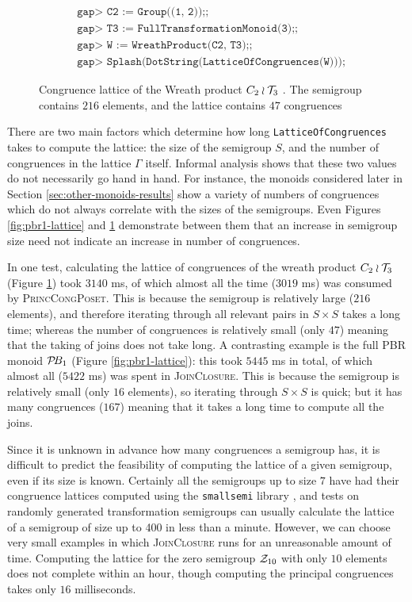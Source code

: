 \begin{figure}[h]
  \begin{align*}
    &\texttt{gap> C2 := Group((1, 2));;} \\
    &\texttt{gap> T3 := FullTransformationMonoid(3);;} \\
    &\texttt{gap> W := WreathProduct(C2, T3);;} \\
    &\texttt{gap> Splash(DotString(LatticeOfCongruences(W)));}
  \end{align*}
  \vspace{-1.0cm}
  \caption[Congruence lattice of the Wreath product $C_2 \wr \T_3$]
  {Congruence lattice of the Wreath product $C_2 \wr \T_3$
    \cite[\S10.1]{wreath}.  The semigroup contains $216$ elements, and the
    lattice contains $47$ congruences}
  \label{fig:c2-wr-t3-lattice}
\end{figure}

There are two main factors which determine how long
\texttt{LatticeOfCongruences} takes to compute the lattice: the size of the
semigroup $S$, and the number of congruences in the lattice $\Gamma$ itself.
Informal analysis shows that these two values do not necessarily go hand in
hand.  For instance, the monoids considered later in Section
\ref{sec:other-monoids-results} show a variety of numbers of congruences which
do not always correlate with the sizes of the semigroups.  Even Figures
\ref{fig:pbr1-lattice} and \ref{fig:c2-wr-t3-lattice} demonstrate between them
that an increase in semigroup size need not indicate an increase in number of
congruences.

In one test, calculating the lattice of congruences of the wreath product
$C_2 \wr \T_3$ (Figure \ref{fig:c2-wr-t3-lattice}) took $3140$ ms, of which
almost all the time ($3019$ ms) was consumed by \textsc{PrincCongPoset}.  This
is because the semigroup is relatively large ($216$ elements), and therefore
iterating through all relevant pairs in $S \times S$ takes a long time; whereas
the number of congruences is relatively small (only $47$) meaning that the
taking of joins does not take long.  A contrasting example is the full PBR
monoid $\mathcal{P}\!B_1$ (Figure \ref{fig:pbr1-lattice}): this took $5445$ ms in total,
of which almost all ($5422$ ms) was spent in \textsc{JoinClosure}.  This is
because the semigroup is relatively small (only $16$ elements), so iterating
through $S \times S$ is quick; but it has many congruences ($167$) meaning that
it takes a long time to compute all the joins.

Since it is unknown in advance how many congruences a semigroup has, it is
difficult to predict the feasibility of computing the lattice of a given
semigroup, even if its size is known.  Certainly all the semigroups up to size
$7$ have had their congruence lattices computed using the \texttt{smallsemi}
library \cite{smallsemi}, and tests on randomly generated transformation
semigroups can usually calculate the lattice of a semigroup of size up to 400 in
less than a minute.  However, we can choose very small examples in which
\textsc{JoinClosure} runs for an unreasonable amount of time.  Computing the
lattice for the zero semigroup $\mathcal{Z}_{10}$ with only $10$ elements does not
complete within an hour, though computing the principal congruences takes
only $16$ milliseconds.

